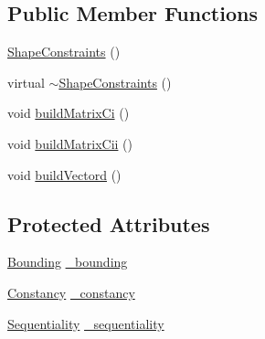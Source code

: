 \subsection*{\-Public \-Member \-Functions}
\begin{DoxyCompactItemize}
\item 
\hyperlink{classShapeConstraints_a64f2900bc242720b52f6546e44858e33}{\-Shape\-Constraints} ()
\item 
virtual \hyperlink{classShapeConstraints_a4da7b352ebe70cdfb8a6bcecbe6986ec}{$\sim$\-Shape\-Constraints} ()
\item 
void \hyperlink{classShapeConstraints_a5106b5a5d1b55e1751423f2af1102c4e}{build\-Matrix\-Ci} ()
\item 
void \hyperlink{classShapeConstraints_a22fcfce709900f384603a759729bdbcd}{build\-Matrix\-Cii} ()
\item 
void \hyperlink{classShapeConstraints_ad7fa37ff0da8688ec2f51add0731a232}{build\-Vectord} ()
\end{DoxyCompactItemize}
\subsection*{\-Protected \-Attributes}
\begin{DoxyCompactItemize}
\item 
\hyperlink{classBounding}{\-Bounding} \hyperlink{classShapeConstraints_aec4139d7b2b7af78543227873fcc9b6c}{\-\_\-bounding}
\item 
\hyperlink{classConstancy}{\-Constancy} \hyperlink{classShapeConstraints_a1682a6b89b7c6c058ccb183b689862a3}{\-\_\-constancy}
\item 
\hyperlink{classSequentiality}{\-Sequentiality} \hyperlink{classShapeConstraints_a0a503cf10835b98ddaa4031a7c63ef42}{\-\_\-sequentiality}
\end{DoxyCompactItemize}


